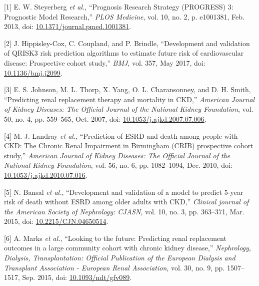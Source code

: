 \documentclass[
]{article}
\newenvironment{cslreferences}%
  {}%
  {\par}
\begin{document}
\hypertarget{refs}{}
\begin{cslreferences}
\leavevmode\hypertarget{ref-steyerberg_prognosis_2013}{}%
{[}1{]} E. W. Steyerberg \emph{et al.}, ``Prognosis Research Strategy (PROGRESS) 3: Prognostic Model Research,'' \emph{PLOS Medicine}, vol. 10, no. 2, p. e1001381, Feb. 2013, doi: \href{https://doi.org/10.1371/journal.pmed.1001381}{10.1371/journal.pmed.1001381}.

\leavevmode\hypertarget{ref-hippisley-cox_development_2017}{}%
{[}2{]} J. Hippisley-Cox, C. Coupland, and P. Brindle, ``Development and validation of QRISK3 risk prediction algorithms to estimate future risk of cardiovascular disease: Prospective cohort study,'' \emph{BMJ}, vol. 357, May 2017, doi: \href{https://doi.org/10.1136/bmj.j2099}{10.1136/bmj.j2099}.

\leavevmode\hypertarget{ref-johnson_predicting_2007}{}%
{[}3{]} E. S. Johnson, M. L. Thorp, X. Yang, O. L. Charansonney, and D. H. Smith, ``Predicting renal replacement therapy and mortality in CKD,'' \emph{American Journal of Kidney Diseases: The Official Journal of the National Kidney Foundation}, vol. 50, no. 4, pp. 559--565, Oct. 2007, doi: \href{https://doi.org/10.1053/j.ajkd.2007.07.006}{10.1053/j.ajkd.2007.07.006}.

\leavevmode\hypertarget{ref-landray_prediction_2010}{}%
{[}4{]} M. J. Landray \emph{et al.}, ``Prediction of ESRD and death among people with CKD: The Chronic Renal Impairment in Birmingham (CRIB) prospective cohort study,'' \emph{American Journal of Kidney Diseases: The Official Journal of the National Kidney Foundation}, vol. 56, no. 6, pp. 1082--1094, Dec. 2010, doi: \href{https://doi.org/10.1053/j.ajkd.2010.07.016}{10.1053/j.ajkd.2010.07.016}.

\leavevmode\hypertarget{ref-bansal_development_2015}{}%
{[}5{]} N. Bansal \emph{et al.}, ``Development and validation of a model to predict 5-year risk of death without ESRD among older adults with CKD,'' \emph{Clinical journal of the American Society of Nephrology: CJASN}, vol. 10, no. 3, pp. 363--371, Mar. 2015, doi: \href{https://doi.org/10.2215/CJN.04650514}{10.2215/CJN.04650514}.

\leavevmode\hypertarget{ref-marks_looking_2015}{}%
{[}6{]} A. Marks \emph{et al.}, ``Looking to the future: Predicting renal replacement outcomes in a large community cohort with chronic kidney disease,'' \emph{Nephrology, Dialysis, Transplantation: Official Publication of the European Dialysis and Transplant Association - European Renal Association}, vol. 30, no. 9, pp. 1507--1517, Sep. 2015, doi: \href{https://doi.org/10.1093/ndt/gfv089}{10.1093/ndt/gfv089}.


\end{cslreferences}
\end{document}

